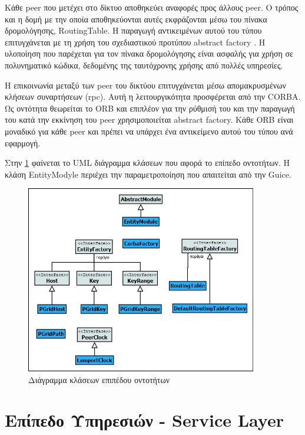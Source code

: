 Κάθε peer που μετέχει στο δίκτυο αποθηκεύει αναφορές προς άλλους 
peer. Ο τρόπος και η δομή με την οποία αποθηκεύονται αυτές εκφράζονται 
μέσω του πίνακα δρομολόγησης, RoutingTable. Η παραγωγή αντικειμένων 
αυτού του τύπου επιτυγχάνεται με τη χρήση του σχεδιαστικού προτύπου 
abstract factory \citep{GoF}. Η υλοποίηση που παρέχεται για τον 
πίνακα δρομολόγησης είναι ασφαλής για χρήση σε πολυνηματικό κώδικα, 
δεδομένης της ταυτόχρονης χρήσης από πολλές υπηρεσίες.

Η επικοινωνία μεταξύ των peer του δικτύου επιτυγχάνεται μέσω 
απομακρυσμένων κλήσεων συναρτήσεων (rpc). Αυτή η 
λειτουργικότητα προσφέρεται από την CORBA. Ως οντότητα θεωρείται το ORB 
και επιπλέον για την ρύθμισή του και την παραγωγή του κατά την εκκίνηση 
του peer χρησιμοποιείται abstract factory. Κάθε ORB είναι μοναδικό για 
κάθε peer και πρέπει να υπάρχει ένα αντικείμενο αυτού του τύπου ανά 
εφαρμογή.

Στην \ref{fig:EntityLayer} φαίνεται το UML διάγραμμα κλάσεων που αφορά 
το επίπεδο οντοτήτων. Η κλάση EntityModyle περιέχει την παραμετροποίηση 
που απαιτείται από την Guice.

\begin{figure}[htbp]
  \begin{center}
    \includegraphics[width=0.9\textwidth]{Figures/Architecture/Entity_Layer/EntityLayer_ClassDiagram.png}
  \end{center}
  \caption{Διάγραμμα κλάσεων επιπέδου οντοτήτων}
  \label{fig:EntityLayer}
\end{figure}

\section{Επίπεδο Υπηρεσιών - Service Layer}

